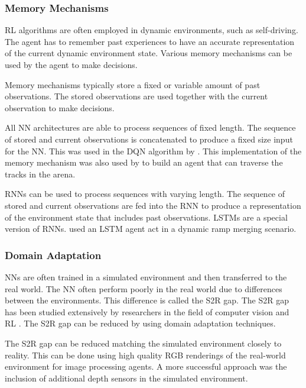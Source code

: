 
\subsubsection{Memory Mechanisms}
\ac{RL} algorithms are often employed in dynamic environments, such as self-driving. The agent has to remember past experiences to have an accurate representation of the current dynamic environment state. Various memory mechanisms can be used by the agent to make decisions. 

Memory mechanisms typically store a fixed or variable amount of past observations. The stored observations are used together with the current observation to make decisions.

All \ac{NN} architectures are able to process sequences of fixed length. The sequence of stored and current observations is concatenated to produce a fixed size input for the \ac{NN}. This was used in the \ac{DQN} algorithm by \textcite{atari}. This implementation of the memory mechanism was also used by \textcite{maximilian} to build an agent that can traverse the tracks in the arena.


\acp{RNN} can be used to process sequences with varying length. The sequence of stored and current observations are fed into the \ac{RNN} to produce a representation of the environment state that includes past observations. \acp{LSTM} are a special version of \acp{RNN}. \textcite{lstm_ramp} used an \ac{LSTM} agent act in a dynamic ramp merging scenario.


\subsubsection{Domain Adaptation}

\acp{NN} are often trained in a simulated environment and then transferred to the real world. The \acs{NN} often perform poorly in the real world due to differences between the environments. This difference is called the \ac{S2R} gap. The \ac{S2R} gap has been studied extensively by researchers in the field of computer vision \autocite{sim2RealGap_rl} and \ac{RL} \autocite{sim2RealGap_vision}. The \ac{S2R} gap can be reduced by using domain adaptation techniques.

The \ac{S2R} gap can be reduced matching the simulated environment closely to reality. This can be done using high quality RGB renderings of the real-world environment for image processing agents. A more successful approach was the inclusion of additional depth sensors in the simulated environment. 

